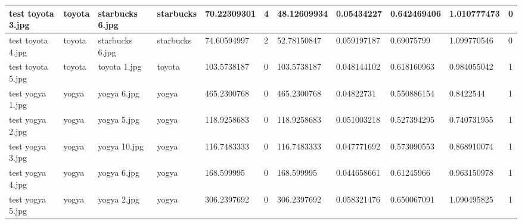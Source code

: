 \begin{landscape}
\begin{longtable}{|p{2cm}|p{1.5cm}|p{2cm}|p{1.5cm}|p{2cm}|p{1cm}|p{2cm}|p{2cm}|p{2cm}|p{2cm}|p{1cm}|}
		test toyota 3.jpg    & toyota           & starbucks 6.jpg       & starbucks                   & 70.22309301           & 4                       & 48.12609934                & 0.05434227            & 0.642469406           & 1.010777473              & 0                \\ \hline
		test toyota 4.jpg    & toyota           & starbucks 6.jpg       & starbucks                   & 74.60594997           & 2                       & 52.78150847                & 0.059197187           & 0.69075799            & 1.099770546              & 0                \\ \hline
		test toyota 5.jpg    & toyota           & toyota 1.jpg          & toyota                      & 103.5738187           & 0                       & 103.5738187                & 0.048144102           & 0.618160963           & 0.984055042              & 1                \\ \hline
		test yogya 1.jpg     & yogya            & yogya 6.jpg           & yogya                       & 465.2300768           & 0                       & 465.2300768                & 0.04822731            & 0.550886154           & 0.8422544                & 1                \\ \hline
		test yogya 2.jpg     & yogya            & yogya 5.jpg           & yogya                       & 118.9258683           & 0                       & 118.9258683                & 0.051003218           & 0.527394295           & 0.740731955              & 1                \\ \hline
		test yogya 3.jpg     & yogya            & yogya 10.jpg          & yogya                       & 116.7483333           & 0                       & 116.7483333                & 0.047771692           & 0.573090553           & 0.868910074              & 1                \\ \hline
		test yogya 4.jpg     & yogya            & yogya 6.jpg           & yogya                       & 168.599995            & 0                       & 168.599995                 & 0.044658661           & 0.61245966            & 0.963150978              & 1                \\ \hline
		test yogya 5.jpg     & yogya            & yogya 2.jpg           & yogya                       & 306.2397692           & 0                       & 306.2397692                & 0.058321476           & 0.650067091           & 1.090495825              & 1                \\ \hline
	\end{longtable}
\end{landscape}

